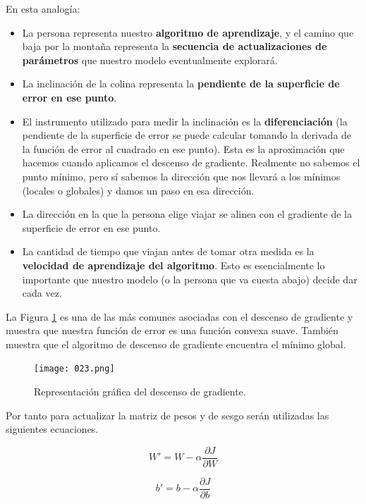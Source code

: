 \documentclass[14.5pt,a4paper]{article}
\begin{document}
En esta analogía:
\begin{itemize}

\item La persona representa nuestro \textbf{algoritmo de aprendizaje}, y
el camino que baja por la montaña representa la \textbf{secuencia de actualizaciones de parámetros} que nuestro modelo eventualmente explorará.
\item La inclinación de la colina representa la \textbf{pendiente de la superficie de error en ese punto}.
\item El instrumento utilizado para medir la inclinación es la \textbf{diferenciación} (la pendiente de la superficie de error se puede calcular tomando la derivada de la función de error al cuadrado en ese punto). Esta es la aproximación que hacemos cuando aplicamos el descenso de gradiente. Realmente no sabemos el punto mínimo, pero sí sabemos la dirección que nos llevará a los mínimos (locales o globales) y damos un paso en esa dirección.
\item La dirección en la que la persona elige viajar se alinea con el gradiente de la superficie de error en ese punto.
\item La cantidad de tiempo que viajan antes de tomar otra medida es la \textbf{velocidad de aprendizaje del algoritmo}. Esto es esencialmente lo importante que nuestro modelo (o la persona que va cuesta abajo) decide dar cada vez.

\end{itemize}

La Figura \ref{fig:gd} es una de las más comunes asociadas con el descenso de gradiente y muestra que nuestra función de error es una función convexa suave. También muestra que el algoritmo de descenso de gradiente encuentra el mínimo global.

\begin{figure}[H]
	\begin{center}				
	\texttt{[image: 023.png]}
  	\caption{Representación gráfica del descenso de gradiente.}
  	\label{fig:gd}
  	\end{center}
\end{figure}

Por tanto para actualizar la matriz de pesos y de sesgo serán utilizadas las siguientes ecuaciones.

\begin{equation}
W' = W - \alpha \frac{\partial J}{\partial W}
\end{equation}

\begin{equation}
b' = b - \alpha \frac{\partial J}{\partial b}
\end{equation}
\end{document}

